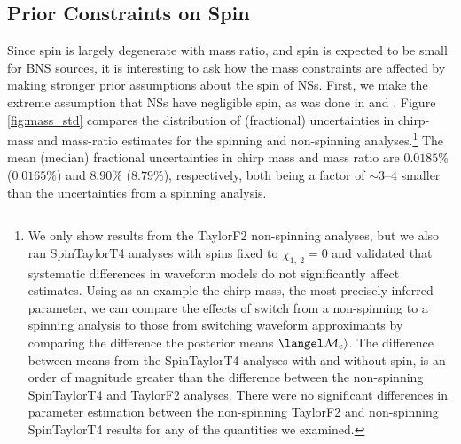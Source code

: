 \subsection{Prior Constraints on Spin}
\label{subsec:prior_constraints}

Since spin is largely degenerate with mass ratio, and spin is expected to be small for BNS sources, it is interesting to ask how the mass constraints are affected by making stronger prior assumptions about the spin of NSs.  First, we make the extreme assumption that NSs have negligible spin, as was done in \citet{Singer_2014} and \citet{Berry_2014}.  Figure \ref{fig:mass_std} compares the distribution of (fractional) uncertainties in chirp-mass and mass-ratio estimates for the spinning and non-spinning analyses.\footnote{We only show results from the TaylorF2 non-spinning analyses, but we also ran SpinTaylorT4 analyses with spins fixed to $\chi_{1,~2}=0$ and validated that systematic differences in waveform models do not significantly affect estimates. Using as an example the chirp mass, the most precisely inferred parameter, we can compare the effects of switch from a non-spinning to a spinning analysis to those from switching waveform approximants by comparing the difference the posterior means $\langel \mathcal{M}_\mathrm{c}\rangle$. The difference between means from the SpinTaylorT4 analyses with and without spin, is an order of magnitude greater than the difference between the non-spinning SpinTaylorT4 and TaylorF2 analyses. There were no significant differences in parameter estimation between the non-spinning TaylorF2 and non-spinning SpinTaylorT4 results for any of the quantities we examined.} The mean (median) fractional uncertainties in chirp mass and mass ratio are $0.0185\%$ ($0.0165\%$) and $8.90\%$ ($8.79\%$), respectively, both being a factor of $\sim3$--$4$ smaller than the uncertainties from a spinning analysis.
  
  
  
  
  
  
  
  